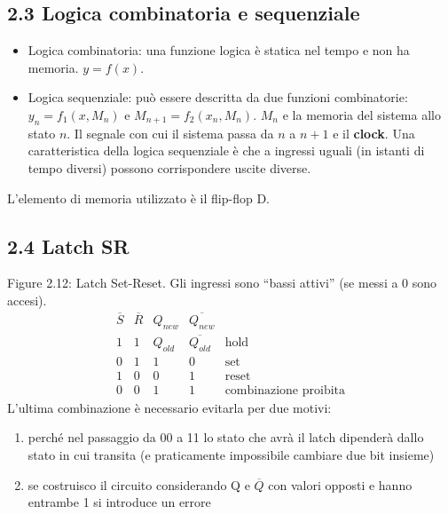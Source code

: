\documentclass[
]{article}
\providecommand{\tightlist}{%
  \setlength{\itemsep}{0pt}\setlength{\parskip}{0pt}}
\begin{document}
\subsection{2.3 Logica combinatoria e
sequenziale}\label{logica-combinatoria-e-sequenziale}

\begin{itemize}
\tightlist
\item
  Logica combinatoria: una funzione logica è statica nel tempo e non ha
  memoria. \(y=f(x)\).
\item
  Logica sequenziale: può essere descritta da due funzioni combinatorie:
  \(y_{n}=f_{1}(x,M_{n})\) e \(M_{n+1}=f_{2}(x_{n},M_{n})\). \(M_{n}\) e
  la memoria del sistema allo stato \(n\). \newline Il segnale con cui
  il sistema passa da \(n\) a \(n+1\) e il \textbf{clock}. Una
  caratteristica della logica sequenziale è che a ingressi uguali (in
  istanti di tempo diversi) possono corrispondere uscite diverse.
\end{itemize}

L'elemento di memoria utilizzato è il flip-flop D.

\subsection{2.4 Latch SR}\label{latch-sr}

Figure 2.12: Latch Set-Reset. Gli ingressi sono ``bassi attivi'' (se
messi a 0 sono accesi). \[
\begin{array}{ccccc}\overline{S}&\overline{R}&Q_{new}&\overline{Q_{new}}\\\hline1&1&Q_{old}&\overline{Q_{old}}&\text{hold}\\0&1&1&0&\text{set}\\1&0&0&1&\text{reset}\\0&0&1&1&\text{combinazione proibita}\end{array}
\] L'ultima combinazione è necessario evitarla per due motivi:

\begin{enumerate}
\def\labelenumi{\arabic{enumi}.}
\tightlist
\item
  perché nel passaggio da 00 a 11 lo stato che avrà il latch dipenderà
  dallo stato in cui transita (e praticamente impossibile cambiare due
  bit insieme)
\item
  se costruisco il circuito considerando Q e \(\overline{Q}\) con valori
  opposti e hanno entrambe 1 si introduce un errore
\end{enumerate}
\end{document}
